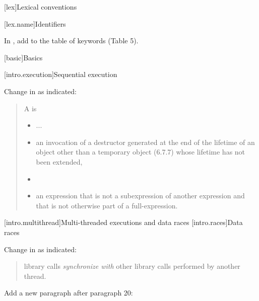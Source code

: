 \setcounter{section}{9}
[lex]{Lexical conventions}


[lex.name]{Identifiers}

\pnum
In ,
add  to the table of keywords (Table 5).

[basic]{Basics}

\setcounter{section}{9}

[intro.execution]{Sequential execution}

Change in  as indicated:

\begin{quote}
\setcounter{Paras}{4}
\setcounter{Bullets1}{3}
\pnum
A  is

\begin{itemize}
\item
  ...
\item
  an invocation of a destructor generated at the end of the lifetime of
  an object other than a temporary object (6.7.7) whose lifetime has not
  been extended, 
\item
\item
  an expression that is not a subexpression of another expression and
  that is not otherwise part of a full-expression.
\end{itemize}
\end{quote}

[intro.multithread]{Multi-threaded executions and data races}
[intro.races]{Data races} 

Change in  as indicated:

\begin{quote}
\setcounter{Paras}{5}
\pnum
{}  library
calls  \emph{synchronize with} other  library calls performed by another thread.
\end{quote}

Add a new paragraph after  paragraph 20:

